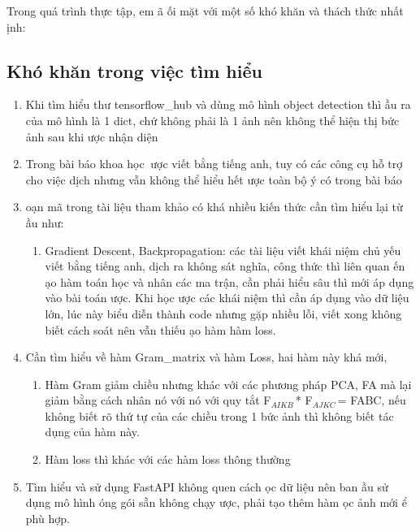 \documentclass{article}
\begin{document}
\noindent 

\noindent Trong qu\'{a} tr\`{i}nh thực tập, em {\dj}\~{a} {\dj}ối mặt với một số kh\'{o} kh\u{a}n v\`{a} th\'{a}ch thức nhất {\dj}ịnh:


\subsection{ Kh\'{o} kh\u{a}n trong việc t\`{i}m hiểu}

\begin{enumerate}
\item  Khi t\`{i}m hiểu thư tensorflow\_hub v\`{a} d\`{u}ng m\^{o} h\`{i}nh object detection th\`{i} {\dj}ầu ra của m\^{o} h\`{i}nh l\`{a} 1 dict, chứ kh\^{o}ng phải l\`{a} 1 ảnh n\^{e}n kh\^{o}ng thể hiện thị bức ảnh sau khi {\dj}ược nhận diện

\item  Trong b\`{a}i b\'{a}o khoa học ${}^{\ }${\dj}ược viết bằng tiếng anh, tuy c\'{o} c\'{a}c c\^{o}ng cụ hỗ trợ cho việc dịch nhưng vẫn kh\^{o}ng thể hiểu hết {\dj}ược to\`{a}n bộ \'{y} c\'{o} trong b\`{a}i b\'{a}o

\item  {\DJ}oạn m\~{a} trong t\`{a}i liệu tham khảo c\'{o} kh\'{a} nhiều kiến thức cần t\`{i}m hiểu lại từ {\dj}ầu như:

\begin{enumerate}
\item  Gradient Descent, Backpropagation: c\'{a}c t\`{a}i liệu viết kh\'{a}i niệm chủ yếu viết bằng tiếng anh, dịch ra kh\^{o}ng s\'{a}t ngh\~{i}a, c\^{o}ng thức th\`{i} li\^{e}n quan {\dj}ến {\dj}ạo h\`{a}m to\'{a}n học v\`{a} nh\^{a}n c\'{a}c ma trận, cần phải hiểu s\^{a}u th\`{i} mới \'{a}p dụng v\`{a}o b\`{a}i to\'{a}n {\dj}ược. Khi học {\dj}ược c\'{a}c kh\'{a}i niệm th\`{i} cần \'{a}p dụng v\`{a}o dữ liệu lớn, l\'{u}c n\`{a}y biểu diễn th\`{a}nh code nhưng gặp nhiều lỗi, viết xong kh\^{o}ng biết c\'{a}ch so\'{a}t n\^{e}n vẫn thiếu {\dj}ạo h\`{a}m h\`{a}m loss.
\end{enumerate}

\item  Cần t\`{i}m hiểu về h\`{a}m Gram\_matrix v\`{a} h\`{a}m Loss, hai h\`{a}m n\`{a}y kh\'{a} mới, 

\begin{enumerate}
\item  H\`{a}m Gram giảm chiều nhưng kh\'{a}c với c\'{a}c phương ph\'{a}p PCA, FA m\`{a} lại giảm bằng c\'{a}ch nh\^{a}n n\'{o} với n\'{o} với quy tắt F${}_{AIKB\ }$* F${}_{AJKC\ }$= FABC, nếu kh\^{o}ng biết r\~{o} thứ tự của c\'{a}c chiều trong 1 bức ảnh th\`{i} kh\^{o}ng biết t\'{a}c dụng của h\`{a}m n\`{a}y.

\item  H\`{a}m loss th\`{i} kh\'{a}c với c\'{a}c h\`{a}m loss th\^{o}ng thường
\end{enumerate}

\item  T\`{i}m hiểu v\`{a} sử dụng FastAPI kh\^{o}ng quen c\'{a}ch {\dj}ọc dữ liệu n\^{e}n ban {\dj}ầu sử dụng m\^{o} h\`{i}nh {\dj}\'{o}ng g\'{o}i sẵn kh\^{o}ng chạy {\dj}ược, phải tạo th\^{e}m h\`{a}m {\dj}ọc ảnh mới {\dj}ể ph\`{u} hợp.
\end{enumerate}
\end{document}
